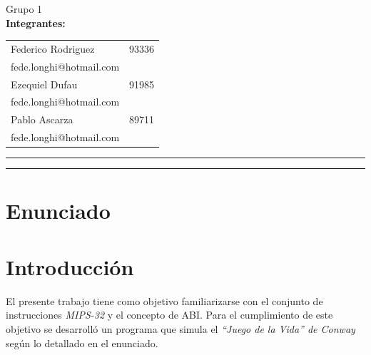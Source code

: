 \documentclass[11pt,a4paper]{article}
\begin{document}
\begin{titlepage}
	\begin{table}[H]
		\begin{flushleft}
		{\Large Grupo 1}\\
		\vspace{0.01\textheight}
		\textbf{Integrantes:}\\
		\vspace{0.01\textheight}
		\begin{tabular}{l r}
			Federico Rodriguez  & 93336\\
			\hspace{0.05\textwidth}fede.longhi@hotmail.com&\\
			Ezequiel Dufau & 91985\\
			\hspace{0.05\textwidth}fede.longhi@hotmail.com&\\
			Pablo Ascarza & 89711\\
			\hspace{0.05\textwidth}fede.longhi@hotmail.com&\\
		\end{tabular}
		\end{flushleft}
	\end{table}
	
	\vspace{0.05\textheight}
	\vspace{2pt}
	\vfill
	\rule{\textwidth}{1pt}\par %
	\vspace{2pt}\vspace{-\baselineskip} %
	\rule{\textwidth}{0.4pt}\par %
	
\end{titlepage}

\tableofcontents
\newpage

\section{Enunciado}

\section{Introducción}
El presente trabajo tiene como objetivo familiarizarse con el conjunto de instrucciones \emph{MIPS-32} y el concepto de ABI. Para el cumplimiento de este objetivo se desarrolló un programa que simula el \emph{``Juego de la Vida'' de Conway} según lo detallado en el enunciado.
\end{document}
